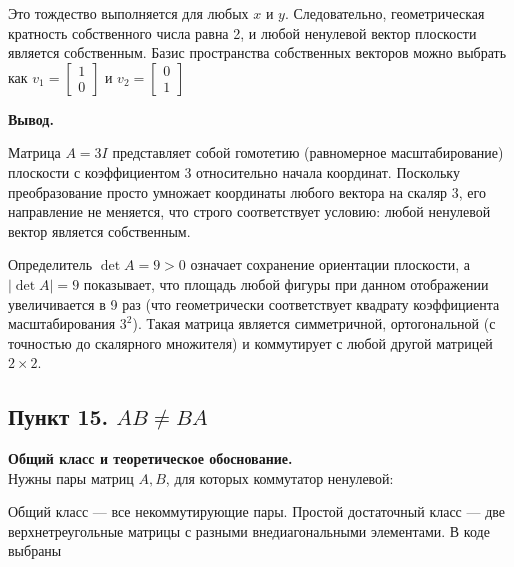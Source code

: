 \documentclass[a4paper,14pt]{extarticle}
\begin{document}
Это тождество выполняется для любых \(x\) и \(y\). Следовательно,
геометрическая кратность собственного числа равна 2, и любой ненулевой
вектор плоскости является собственным. Базис пространства собственных
векторов можно выбрать как
\(v_1 = \begin{bmatrix} 1 \\ 0 \end{bmatrix}\) и
\(v_2 = \begin{bmatrix} 0 \\ 1 \end{bmatrix}\)

\textbf{Вывод.}

Матрица \(A = 3I\) представляет собой гомотетию (равномерное
масштабирование) плоскости с коэффициентом 3 относительно начала
координат. Поскольку преобразование просто умножает координаты любого
вектора на скаляр 3, его направление не меняется, что строго
соответствует условию: любой ненулевой вектор является собственным.

Определитель \(\det A = 9 > 0\) означает сохранение ориентации
плоскости, а \(|\det A| = 9\) показывает, что площадь любой фигуры при
данном отображении увеличивается в 9 раз (что геометрически
соответствует квадрату коэффициента масштабирования \(3^2\)). Такая
матрица является симметричной, ортогональной (с точностью до скалярного
множителя) и коммутирует с любой другой матрицей \(2 \times 2\).

\hypertarget{ux43fux443ux43dux43aux442-15.-abne-ba}{%
\subsection{\texorpdfstring{Пункт 15.
\(AB\ne BA\)}{Пункт 15. AB\textbackslash ne BA}}\label{ux43fux443ux43dux43aux442-15.-abne-ba}}

\textbf{Общий класс и теоретическое обоснование.}\\
Нужны пары матриц \(A,B\), для которых коммутатор ненулевой: \begin{center}\end{center} Общий класс --- все некоммутирующие пары. Простой достаточный класс
--- две верхнетреугольные матрицы с разными внедиагональными элементами.
В коде выбраны \begin{center}\end{center}
\end{document}
